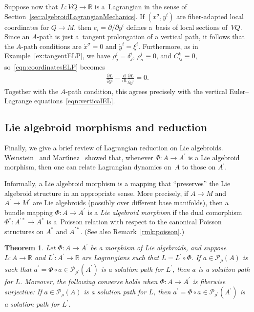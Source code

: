 \documentclass[10pt,a4paper]{amsart}
\numberwithin{equation}{section}
\newtheorem{Theorem}{Theorem}[section]
\begin{document}
Suppose now that $ L \colon V Q \rightarrow \mathbb{R} $ is a~Lagrangian in the sense of Section~\ref{sec:algebroidLagrangianMechanics}. If $ ( x ^\sigma , y ^i ) $ are f\/iber-adapted local coordinates for $Q \rightarrow M $, then $ e _i = \partial / \partial y ^i $ def\/ines a~basis of local sections of~$ V Q $. Since an $A$-path is just a~tangent prolongation of a vertical path, it follows that the $A$-path conditions are $ \dot{x} ^\sigma = 0 $ and $ \dot{y} ^i = \xi ^i $. Furthermore, as in Example~\ref{ex:tangentELP}, we have $ \rho ^i _j = \delta ^i _j $, $ \rho ^i _\sigma \equiv 0 $, and $ C _{ i j } ^k \equiv 0 $, so~\eqref{eqn:coordinatesELP} becomes
\begin{gather*}
 \frac{ \partial L }{ \partial y ^i } - \frac{\mathrm{d}}{\mathrm{d}t} \frac{ \partial L }{ \partial \dot{y} ^i } = 0 .
\end{gather*}
Together with the $A$-path condition, this agrees precisely with the vertical Euler--Lagrange equations~\eqref{eqn:verticalEL}.

\subsection{Lie algebroid morphisms and reduction}

Finally, we give a brief review of Lagrangian reduction on Lie algebroids. Weinstein~\cite{Weinstein1996} and Mart\'{\i}nez~\cite{Martinez2008} showed that, whenever $ \Phi \colon A \rightarrow A ^\prime $ is a Lie algebroid morphism, then one can relate Lagrangian dynamics on~$A$ to those on $ A ^\prime $.

Informally, a Lie algebroid morphism is a mapping that ``preserves'' the Lie algebroid structure in an appropriate sense. More precisely, if $ A \rightarrow M $ and $ A ^\prime \rightarrow M ^\prime $ are Lie algebroids (possibly over dif\/ferent base manifolds), then a bundle mapping $ \Phi \colon A \rightarrow A ^\prime $ is a \emph{Lie algebroid morphism} if the dual comorphism $ \Phi ^\ast \colon A ^{\prime \ast} \rightarrow A ^\ast $ is a~Poisson relation with respect to the canonical Poisson structures on $ A ^\ast $ and $ A ^{\prime \ast} $. (See also
Remark~\ref{rmk:poisson}.)

\begin{Theorem} \label{thm:weinsteinMartinez} Let $ \Phi \colon A \rightarrow A ^\prime $ be a morphism of Lie algebroids, and suppose $ L \colon A \rightarrow \mathbb{R} $ and $ L ^\prime \colon A ^\prime \rightarrow \mathbb{R} $ are Lagrangians such that $ L = L ^\prime \circ \Phi $. If $ a \in \mathcal{P} _\rho (A) $ is such that $ a ^\prime = \Phi \circ a \in \mathcal{P} _{ \rho ^\prime } ( A ^\prime ) $ is a solution path for $ L ^\prime $, then $a$ is a solution path
 for $L$. Moreover, the following converse holds when $ \Phi \colon A \rightarrow A ^\prime $ is fiberwise surjective: If $ a \in \mathcal{P} _\rho (A) $ is a solution path for $L$, then $ a ^\prime = \Phi \circ a \in \mathcal{P} _{ \rho ^\prime } ( A ^\prime ) $ is a solution path for $ L ^\prime $.
\end{Theorem}
\end{document}
